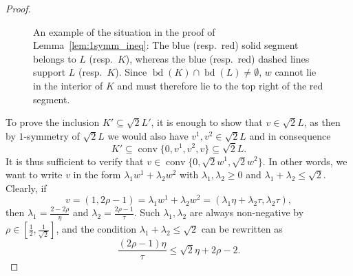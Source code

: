 \documentclass[12pt,a4paper]{article}
\theoremstyle{definition}
\DeclareMathOperator{\conv}{conv}
\DeclareMathOperator{\bd}{bd}
\def\ds{1.5/\scale pt}
\begin{document}
\begin{proof}
\begin{figure}[ht]
%
\caption{
An example of the situation in the proof of Lemma~\ref{lem:1symm_ineq}: The blue (resp.~red) solid segment belongs to $L$ (resp.~$K$), whereas the blue (resp.~red) dashed lines support $L$ (resp.~$K$). Since $\bd(K) \cap \bd(L) \neq \emptyset$, $w$ cannot lie in the interior of $K$ and must therefore lie to the top right of the red segment.
}
%
\label{fig:1symm_general_situation}
\end{figure}



To prove the inclusion $K' \subseteq \sqrt{2}L'$, it is enough to show that $v \in \sqrt{2}L$, as then by $1$-symmetry of $\sqrt{2}L$ we would also have $v^1, v^2 \in \sqrt{2}L$ and in consequence
$$K' \subseteq \conv\{ 0, v^1, v^2, v \} \subseteq \sqrt{2}L.$$
It is thus sufficient to verify that $v \in \conv\{ 0, \sqrt{2}w^1, \sqrt{2}w^2 \}$. In other words, we want to write $v$ in the form $\lambda_1w^1 + \lambda_2w^2$ with $\lambda_1, \lambda_2 \geq 0$ and $\lambda_1+\lambda_2 \leq \sqrt{2}$. Clearly, if 
$$v=(1, 2\rho-1)=\lambda_1w^1+\lambda_2w^2 = (\lambda_1 \eta + \lambda_2 \tau, \lambda_2 \tau),$$
then $\lambda_1=\frac{2-2\rho}{\eta}$ and $\lambda_2 = \frac{2\rho - 1}{\tau}$. Such $\lambda_1, \lambda_2$ are always non-negative by $\rho \in [\frac{1}{2},\frac{1}{\sqrt{2}}]$, and the condition $\lambda_1 + \lambda_2 \leq \sqrt{2}$ can be rewritten as
\begin{equation}
\label{eq:ineq_lambda}
\frac{(2\rho-1)\eta}{\tau} \leq \sqrt{2}\eta + 2 \rho - 2.
\end{equation}


\end{proof}
\end{document}
